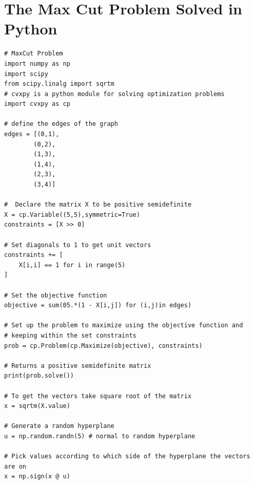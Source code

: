 \section{The Max Cut Problem Solved in Python}
\begin{Verbatim}       
# MaxCut Problem
import numpy as np
import scipy 
from scipy.linalg import sqrtm
# cvxpy is a python module for solving optimization problems
import cvxpy as cp

# define the edges of the graph
edges = [(0,1),
        (0,2),
        (1,3),
        (1,4),
        (2,3),
        (3,4)]

#  Declare the matrix X to be positive semidefinite
X = cp.Variable((5,5),symmetric=True)
constraints = [X >> 0]

# Set diagonals to 1 to get unit vectors
constraints += [
    X[i,i] == 1 for i in range(5)
]

# Set the objective function
objective = sum(05.*(1 - X[i,j]) for (i,j)in edges)

# Set up the problem to maximize using the objective function and
# keeping within the set constraints
prob = cp.Problem(cp.Maximize(objective), constraints)

# Returns a positive semidefinite matrix
print(prob.solve())

# To get the vectors take square root of the matrix
x = sqrtm(X.value)

# Generate a random hyperplane
u = np.random.randn(5) # normal to random hyperplane

# Pick values according to which side of the hyperplane the vectors are on
x = np.sign(x @ u)  
      
\end{Verbatim}










